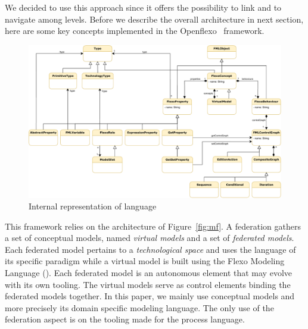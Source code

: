 We decided to use this approach since it offers the possibility to
link and to navigate among levels. Before we describe the overall
architecture in next section, here are some key concepts implemented
in the Openflexo~\parencite{openflexo_link} framework.



\begin{figure}
    \centering
    \includegraphics[width=1.0 \textwidth]{Figures/FMLMetaModel.pdf}
    \caption{Internal representation of \FML language}
    \label{fig:mm}
\end{figure}

This framework relies on the architecture of Figure~\ref{fig:mf}. A federation
gathers a set of conceptual models, named \emph{virtual models} and a
set of \emph{federated models}. Each federated model pertains to a
\emph{technological space} and uses the language of its specific
paradigm while a virtual model is built using the Flexo Modeling
Language (\FML). Each federated model is an autonomous
element that may evolve with its own tooling. The virtual models
serve as control elements binding the federated models together.
In this paper, we mainly use conceptual models and more precisely \FML its domain specific modeling language. The only use of the federation aspect is on the tooling made for the process language.

